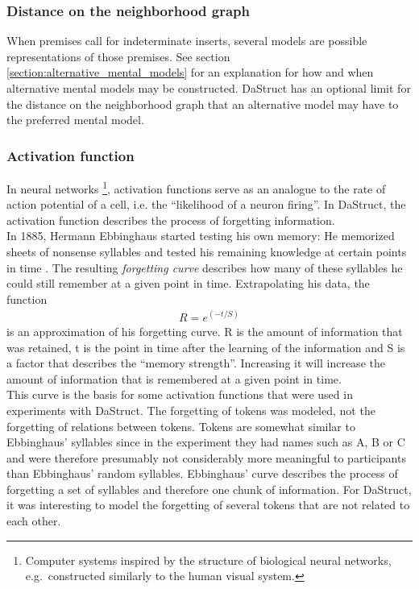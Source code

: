 \documentclass[hidelinks]{scrartcl}
\begin{document}
\subsubsection{Distance on the neighborhood graph}
When \gls{premise}s call for indeterminate inserts, several models are possible representations of those \gls{premise}s. See section \ref{section:alternative_mental_models} for an explanation for how and when alternative mental models may be constructed. DaStruct has an optional limit for the distance on the neighborhood graph that an alternative model may have to the preferred mental model.

\subsubsection{Activation function}\label{sec:activation_function}
In neural networks \footnote{Computer systems inspired by the structure of biological neural networks, e.g.\ constructed similarly to the human visual system.}, activation functions serve as an analogue to the rate of action potential of a cell, i.e. the ``likelihood of a neuron firing''. In DaStruct, the activation function describes the process of forgetting information. \\
In 1885, Hermann Ebbinghaus started testing his own memory: He memorized sheets of nonsense syllables and tested his remaining knowledge at certain points in time \citep{Ebbinghaus.1913}. The resulting \textit{forgetting curve} describes how many of these syllables he could still remember at a given point in time. Extrapolating his data, the function
\begin{gather}
R = e^{(-t/S)}
\end{gather}
is an approximation of his forgetting curve. R is the amount of information that was retained, t is the point in time after the learning of the information and S is a factor that describes the ``memory strength''. Increasing it will increase the amount of information that is remembered at a given point in time. \\

This curve is the basis for some activation functions that were used in experiments with DaStruct. The forgetting of \gls{token}s was modeled, not the forgetting of relations between \gls{token}s. Tokens are somewhat similar to Ebbinghaus' syllables since in the experiment they had names such as A, B or C and were therefore presumably not considerably more meaningful to participants than Ebbinghaus' random syllables. Ebbinghaus' curve describes the process of forgetting a set of syllables and therefore one chunk of information. For DaStruct, it was interesting to model the forgetting of several \gls{token}s that are not related to each other. \\
\end{document}
